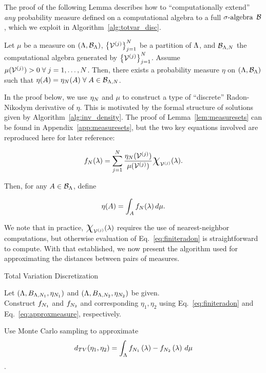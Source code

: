 The proof of the following Lemma describes how to ``computationally extend'' {\em any} probability measure defined on a computational algebra to a full $\sigma\text{-algebra}$ $\mathcal{B}$, which we exploit in Algorithm~\ref{alg:totvar_disc}.

\begin{lem}
\label{lem:measuresets}
Let $\mu$ be a measure on $({\Lambda}, \mathcal{B}_{\Lambda})$, $\left\{\mathcal{V}^{(j)}\right\}_{j=1}^{N}$ be a partition of ${\Lambda}$, and $\mathcal{B}_{{\Lambda}, N}$ the computational algebra generated by $\left\{\mathcal{V}^{(j)}\right\}_{j=1}^{N}$.
Assume $\mu (\mathcal{V}^{(j)}) > 0 \; \forall \; j=1,\hdots, N$.
Then, there exists a probability measure $\eta$ on $({\Lambda}, \mathcal{B}_{\Lambda})$ such that $\eta(A) = \eta_N(A) \; \forall \; A\in\mathcal{B}_{{\Lambda}, N}$.
\end{lem}
In the proof below, we use $\eta_N$ and $\mu$ to construct a type of ``discrete'' Radon-Nikodym derivative of $\eta$.
This is motivated by the formal structure of solutions given by Algorithm~\ref{alg:inv_density}.
The proof of Lemma~\ref{lem:measuresets} can be found in Appendix~\ref{app:measuresets}, but the two key equations involved are reproduced here for later reference:

\begin{equation}\label{eq:finiteradon}
f_\nsamps (\param) = \sum_{j=1}^{\nsamps} \frac{\eta_\nsamps (\VV^{(j)}) }{\mu (\VV^{(j)})} \Chi_{\VV^{(j)}} (\param).
\end{equation}

Then, for any $A\in\mathcal{B}_{\Lambda}$, define

\begin{equation}\label{eq:approxmeasure}
\eta (A) = \int_A f_N (\lambda) \, d\mu.
\end{equation}

We note that in practice, $\Chi_{\VV^{(j)}} (\param)$ requires the use of nearest-neighbor computations, but otherwise evaluation of Eq.~\eqref{eq:finiteradon} is straightforward to compute.
With that established, we now present the algorithm used for approximating the distances between pairs of measures.


\begin{algorithm}
\DontPrintSemicolon
\caption{Total Variation Discretization}
\label{alg:totvar_disc}
Let $({\Lambda}, B_{{\Lambda}, N_1}, \eta_{N_1} )$ and $({\Lambda}, B_{{\Lambda}, N_2}, \eta_{N_2} )$ be given.\\

Construct $f_{N_1}$ and $f_{N_2}$ and corresponding $\eta_1, \eta_2$ using Eq.~\eqref{eq:finiteradon} and Eq.~\eqref{eq:approxmeasure}, respectively.

Use Monte Carlo sampling to approximate
$$ d_{TV}(\eta_1, \eta_2) = \int_{\Lambda} f_{N_1}\left ( \lambda \right ) - f_{N_2}\left ( \lambda \right ) \, d\mu $$.
\end{algorithm}

